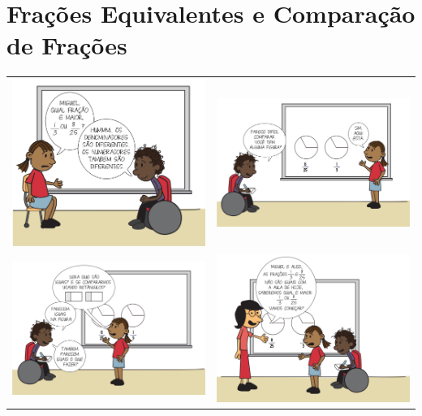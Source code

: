 

\setcounter{chapter}{3}
\chapter{Frações Equivalentes e Comparação de Frações }
\setcounter{subsection}{0}


\noindent\begin{tabular}{cc}
\includegraphics[width=.37\textwidth, keepaspectratio]{../media/cap4/secoes/pngs/quadrinho_01.png} & 
\includegraphics[width=.45\textwidth, keepaspectratio]{../media/cap4/secoes/pngs/quadrinho_02.png} \\
\includegraphics[width=.45\textwidth, keepaspectratio]{../media/cap4/secoes/pngs/quadrinho_03.png} & 
\includegraphics[width=.45\textwidth, keepaspectratio]{../media/cap4/secoes/pngs/quadrinho_04.png}
         \end{tabular}

